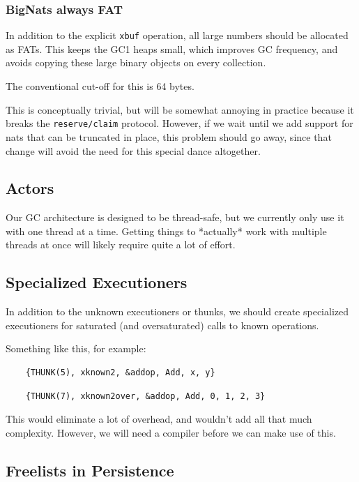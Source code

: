 \subsubsection{BigNats always FAT}

In addition to the explicit \lstinline|xbuf| operation, all large numbers
should be allocated as FATs.  This keeps the GC1 heaps small, which
improves GC frequency, and avoids copying these large binary objects
on every collection.

The conventional cut-off for this is 64 bytes.

This is conceptually trivial, but will be somewhat annoying in practice
because it breaks the \lstinline|reserve/claim| protocol.  However, if
we wait until we add support for nats that can be truncated in place,
this problem should go away, since that change will avoid the need for
this special dance altogether.

\subsection{Actors}

Our GC architecture is designed to be thread-safe, but we currently only
use it with one thread at a time.  Getting things to *actually* work
with multiple threads at once will likely require quite a lot of effort.

\subsection{Specialized Executioners}

In addition to the unknown executioners or thunks, we should create
specialized executioners for saturated (and oversaturated) calls to
known operations.

Something like this, for example:

\begin{verbatim}
    {THUNK(5), xknown2, &addop, Add, x, y}
\end{verbatim}

\begin{verbatim}
    {THUNK(7), xknown2over, &addop, Add, 0, 1, 2, 3}
\end{verbatim}

This would eliminate a lot of overhead, and wouldn't add all that much
complexity.  However, we will need a compiler before we can make use
of this.

\subsection{Freelists in Persistence}

